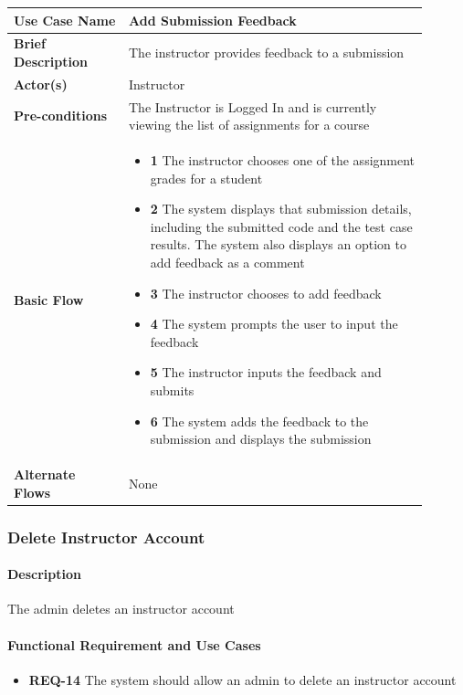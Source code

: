 \documentclass{article}
\begin{document}
\begin{tabular}{| p{0.25\linewidth} | p{0.65\linewidth} |}
  \hline
  \textbf{Use Case Name} & Add Submission Feedback \\
  \hline
  \textbf{Brief Description} & The instructor provides feedback to a submission \\
  \hline
  \textbf{Actor(s)} & Instructor \\
  \hline
  \textbf{Pre-conditions} & The Instructor is Logged In and is currently viewing the list of assignments for a course\\
  \hline
  \textbf{Basic Flow} & \begin{itemize}
    \item[] \textbf{1} The instructor chooses one of the assignment grades for a student
    \item[] \textbf{2} The system displays that submission details, including the submitted code and the test case results. The system also displays an option to add feedback as a comment
    \item[] \textbf{3} The instructor chooses to add feedback
    \item[] \textbf{4} The system prompts the user to input the feedback
    \item[] \textbf{5} The instructor inputs the feedback and submits
    \item[] \textbf{6} The system adds the feedback to the submission and displays the submission
  \end{itemize}\\
  \hline
  \textbf{Alternate Flows} & None\\
  \hline
\end{tabular}

\subsubsection{Delete Instructor Account}

\paragraph{Description} The admin deletes an instructor account

\paragraph{Functional Requirement and Use Cases}

\begin{itemize}
  \item \textbf{REQ-14} The system should allow an admin to delete an instructor account
\end{itemize}
\end{document}
